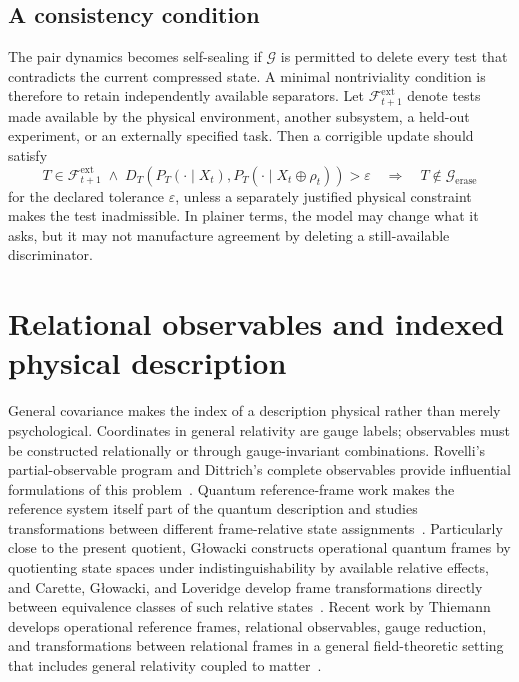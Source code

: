 \documentclass[11pt]{article}
\newcommand{\F}{\mathcal F}
\newcommand{\eps}{\varepsilon}
\begin{document}
\subsection{A consistency condition}

The pair dynamics becomes self-sealing if $\mathcal G$ is permitted to delete every test that contradicts the current compressed state. A minimal nontriviality condition is therefore to retain independently available separators. Let $\F^{\mathrm{ext}}_{t+1}$ denote tests made available by the physical environment, another subsystem, a held-out experiment, or an externally specified task. Then a corrigible update should satisfy
\begin{equation}
  T\in\F^{\mathrm{ext}}_{t+1}
  \;\land\;
  D_T\!\left(P_T(\cdot\mid X_t),P_T(\cdot\mid X_t\oplus\rho_t)\right)>\eps
  \quad\Longrightarrow\quad
  T\notin\mathcal G_{\mathrm{erase}}
  \label{eq:no-self-seal}
\end{equation}
for the declared tolerance $\eps$, unless a separately justified physical constraint makes the test inadmissible. In plainer terms, the model may change what it asks, but it may not manufacture agreement by deleting a still-available discriminator.

\section{Relational observables and indexed physical description}
\label{sec:relational}

General covariance makes the index of a description physical rather than merely psychological. Coordinates in general relativity are gauge labels; observables must be constructed relationally or through gauge-invariant combinations. Rovelli's partial-observable program and Dittrich's complete observables provide influential formulations of this problem~\cite{rovelli2002,dittrich2006}. Quantum reference-frame work makes the reference system itself part of the quantum description and studies transformations between different frame-relative state assignments~\cite{giacomini2019,vanrietvelde2020}. Particularly close to the present quotient, G\l{}owacki constructs operational quantum frames by quotienting state spaces under indistinguishability by available relative effects, and Carette, G\l{}owacki, and Loveridge develop frame transformations directly between equivalence classes of such relative states~\cite{glowacki2023,carette2025}. Recent work by Thiemann develops operational reference frames, relational observables, gauge reduction, and transformations between relational frames in a general field-theoretic setting that includes general relativity coupled to matter~\cite{thiemann2026}.
\end{document}
